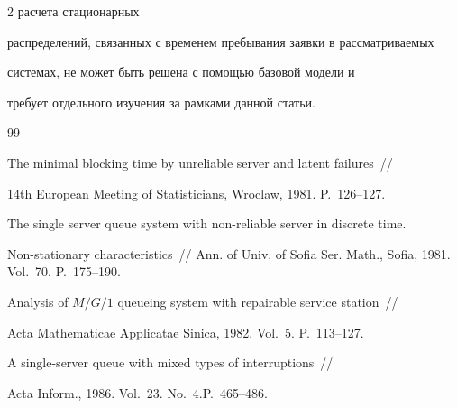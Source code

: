 \begin{multicols}{2}
расчета стационарных


распределений, связанных с временем пребывания заявки в рассматриваемых


системах, не может быть решена с помощью базовой модели и


требует отдельного изучения за рамками данной статьи.








{\small\frenchspacing


{\baselineskip=11.9pt




\begin{thebibliography}{99}    









The minimal blocking time by unreliable server and latent failures~//


14th European Meeting of Statisticians, Wroclaw, 1981. P.~126--127.









The single server queue system with non-reliable server in discrete time.


Non-stationary characteristics~// Ann. of Univ. of Sofia Ser. Math., Sofia, 1981. Vol.~70. P.~175--190.









Analysis of $M/G/1$ queueing system with repairable service station~//


Acta Mathematicae Applicatae Sinica, 1982. Vol.~5. P.~113--127.









A single-server queue with mixed types of interruptions~//


Acta Inform., 1986. Vol.~23. No.~4.\linebreak P.~465--486.






\end{thebibliography}}}
\end{multicols}
